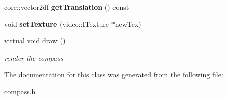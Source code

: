 \begin{DoxyCompactItemize}
\item 
\hypertarget{class_c_g_u_i_compass_a23e48f2cd871f2353430d0751c61a6bf}{
core::vector2df {\bfseries getTranslation} () const }
\label{class_c_g_u_i_compass_a23e48f2cd871f2353430d0751c61a6bf}

\item 
\hypertarget{class_c_g_u_i_compass_a04c7dbca18248f30f2ab2b8cc4de689b}{
void {\bfseries setTexture} (video::ITexture $\ast$newTex)}
\label{class_c_g_u_i_compass_a04c7dbca18248f30f2ab2b8cc4de689b}

\item 
\hypertarget{class_c_g_u_i_compass_a23324fa9227f114ce9e897714a7b18f8}{
virtual void \hyperlink{class_c_g_u_i_compass_a23324fa9227f114ce9e897714a7b18f8}{draw} ()}
\label{class_c_g_u_i_compass_a23324fa9227f114ce9e897714a7b18f8}

\begin{DoxyCompactList}\small\item\em render the compass \item\end{DoxyCompactList}\end{DoxyCompactItemize}


The documentation for this class was generated from the following file:\begin{DoxyCompactItemize}
\item 
compass.h\end{DoxyCompactItemize}
